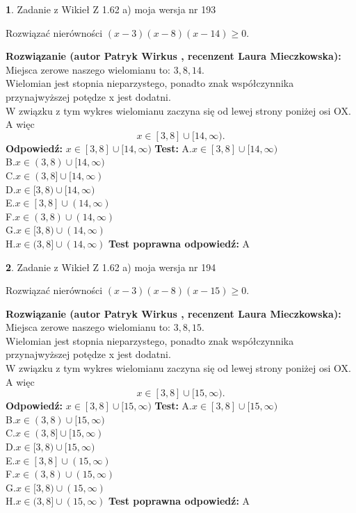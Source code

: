 \documentclass[12pt, a4paper]{article}
\theoremstyle{definition} %
\newtheorem{zad}{}
\newcommand{\zadStart}[1]{\begin{zad}#1\newline}
\newcommand{\zadStop}{\end{zad}}
\newcommand{\rozwStart}[2]{\noindent \textbf{Rozwiązanie (autor #1 , recenzent #2): }\newline}
\newcommand{\rozwStop}{\newline}
\newcommand{\odpStart}{\noindent \textbf{Odpowiedź:}\newline}
\newcommand{\odpStop}{\newline}
\newcommand{\testStart}{\noindent \textbf{Test:}\newline}
\newcommand{\testStop}{\newline}
\newcommand{\kluczStart}{\noindent \textbf{Test poprawna odpowiedź:}\newline}
\newcommand{\kluczStop}{\newline}
\begin{document}
\zadStart{Zadanie z Wikieł Z 1.62 a) moja wersja nr 193}

Rozwiązać nierówności $(x-3)(x-8)(x-14)\ge0$.
\zadStop
\rozwStart{Patryk Wirkus}{Laura Mieczkowska}
Miejsca zerowe naszego wielomianu to: $3, 8, 14$.\\
Wielomian jest stopnia nieparzystego, ponadto znak współczynnika przy\linebreak najwyższej potędze x jest dodatni.\\ W związku z tym wykres wielomianu zaczyna się od lewej strony poniżej osi OX. A więc $$x \in [3,8] \cup [14,\infty).$$
\rozwStop
\odpStart
$x \in [3,8] \cup [14,\infty)$
\odpStop
\testStart
A.$x \in [3,8] \cup [14,\infty)$\\
B.$x \in (3,8) \cup [14,\infty)$\\
C.$x \in (3,8] \cup [14,\infty)$\\
D.$x \in [3,8) \cup [14,\infty)$\\
E.$x \in [3,8] \cup (14,\infty)$\\
F.$x \in (3,8) \cup (14,\infty)$\\
G.$x \in [3,8) \cup (14,\infty)$\\
H.$x \in (3,8] \cup (14,\infty)$
\testStop
\kluczStart
A
\kluczStop



\zadStart{Zadanie z Wikieł Z 1.62 a) moja wersja nr 194}

Rozwiązać nierówności $(x-3)(x-8)(x-15)\ge0$.
\zadStop
\rozwStart{Patryk Wirkus}{Laura Mieczkowska}
Miejsca zerowe naszego wielomianu to: $3, 8, 15$.\\
Wielomian jest stopnia nieparzystego, ponadto znak współczynnika przy\linebreak najwyższej potędze x jest dodatni.\\ W związku z tym wykres wielomianu zaczyna się od lewej strony poniżej osi OX. A więc $$x \in [3,8] \cup [15,\infty).$$
\rozwStop
\odpStart
$x \in [3,8] \cup [15,\infty)$
\odpStop
\testStart
A.$x \in [3,8] \cup [15,\infty)$\\
B.$x \in (3,8) \cup [15,\infty)$\\
C.$x \in (3,8] \cup [15,\infty)$\\
D.$x \in [3,8) \cup [15,\infty)$\\
E.$x \in [3,8] \cup (15,\infty)$\\
F.$x \in (3,8) \cup (15,\infty)$\\
G.$x \in [3,8) \cup (15,\infty)$\\
H.$x \in (3,8] \cup (15,\infty)$
\testStop
\kluczStart
A
\kluczStop
\end{document}
